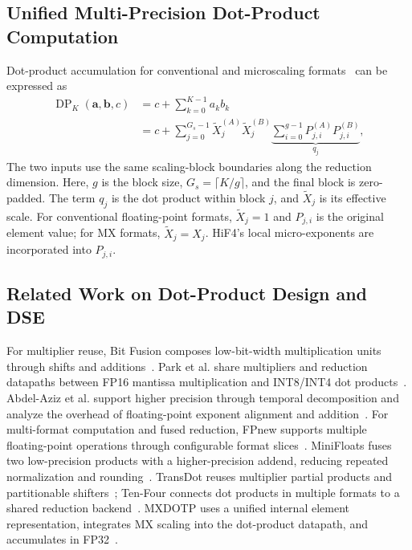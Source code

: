 \documentclass[conference,10pt,letterpaper]{IEEEtran}
\begin{document}
\subsection{Unified Multi-Precision Dot-Product Computation}
\label{sec:tensor_organization}

Dot-product accumulation for conventional and microscaling formats~\cite{ocpmx2023} can be expressed as
\begin{equation}
\begin{aligned}
\operatorname{DP}_K(\mathbf{a},\mathbf{b},c)
&=c+\sum_{k=0}^{K-1}a_kb_k \\
&=c+\sum_{j=0}^{G_s-1}
\widetilde{X}_j^{(A)}\widetilde{X}_j^{(B)}
\underbrace{\sum_{i=0}^{g-1}
P_{j,i}^{(A)}P_{j,i}^{(B)}}_{q_j},
\end{aligned}
\label{eq:blockdot}
\end{equation}
The two inputs use the same scaling-block boundaries along the reduction dimension. Here, $g$ is the block size, $G_s=\lceil K/g\rceil$, and the final block is zero-padded. The term $q_j$ is the dot product within block $j$, and $\widetilde{X}_j$ is its effective scale. For conventional floating-point formats, $\widetilde{X}_j=1$ and $P_{j,i}$ is the original element value; for MX formats, $\widetilde{X}_j=X_j$. HiF4's local micro-exponents are incorporated into $P_{j,i}$.



\subsection{Related Work on Dot-Product Design and DSE}
\label{sec:datapath_sharing}

For multiplier reuse, Bit Fusion composes low-bit-width multiplication units through shifts and additions~\cite{bitfusion2018}. Park et al. share multipliers and reduction datapaths between FP16 mantissa multiplication and INT8/INT4 dot products~\cite{parkMultimode8KMACHWutilizationaware2022}. Abdel-Aziz et al. support higher precision through temporal decomposition and analyze the overhead of floating-point exponent alignment and addition~\cite{abdelaziz2021overheads}. For multi-format computation and fused reduction, FPnew supports multiple floating-point operations through configurable format slices~\cite{mach2020fpnew}. MiniFloats fuses two low-precision products with a higher-precision addend, reducing repeated normalization and rounding~\cite{bertaccini2022minifloat}. TransDot reuses multiplier partial products and partitionable shifters~\cite{transdot2026}; Ten-Four connects dot products in multiple formats to a shared reduction backend~\cite{rout2026tenfourv3}. MXDOTP uses a unified internal element representation, integrates MX scaling into the dot-product datapath, and accumulates in FP32~\cite{islamoglu2025mxdotp}.
\end{document}
